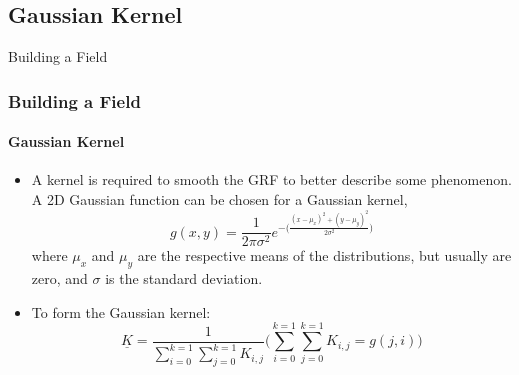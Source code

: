 \documentclass[professionalfont,10pt]{beamer}
\begin{document}
	\subsection{Gaussian Kernel}
	\begin{frame}[t]{Building a Field}
		\frametitle{Building a Field}
		\framesubtitle{Gaussian Kernel}
		\hskip-0.75cm
		\begin{minipage}[t]{0.2\linewidth}\vspace{-0.5cm}
			\tiny\tableofcontents[currentsection,currentsubsection,hideothersubsections,subsectionstyle=show/shaded]
		\end{minipage}
		\hfill%
		\begin{minipage}[t]{0.86\linewidth}\vspace{-0.5cm}
			\begin{flushleft}
				\begin{itemize}
					\item A kernel is required to smooth the GRF to better describe some phenomenon. A 2D Gaussian function can be chosen for a Gaussian kernel,
					\begin{equation}
						g(x, y) = \frac{1}{2\pi\sigma^2}e^{-\Big(\frac{(x-\mu_x)^2 + (y-\mu_y)^2}{2\sigma^2}\Big)}
					\end{equation}
					where $\mu_x$ and $\mu_y$ are the respective means of the distributions, but usually are zero, and $\sigma$ is the standard deviation. \\
					\item To form the Gaussian kernel:
					\begin{equation}
						\underline{K} = \frac{1}{\sum_{i=0}^{k=1}\sum_{j=0}^{k=1} K_{i, j}}\Bigg(\sum_{i=0}^{k=1}\sum_{j=0}^{k=1} K_{i, j} = g(j, i)\Bigg)
					\end{equation}
				\end{itemize}
			\end{flushleft}
		\end{minipage}
		\vfill%
	\end{frame}
\end{document}
